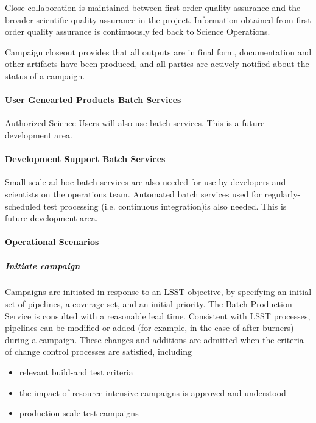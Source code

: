 Close collaboration is maintained between first order quality assurance and the
broader scientific quality assurance in the project. Information obtained from
first order quality assurance is continuously fed back to Science Operations.

Campaign closeout provides that all outputs are in final form, documentation and
other artifacts have been produced, and all parties are actively notified about
the status of a campaign.

\paragraph{User Genearted Products Batch Services}
Authorized Science Users will also use batch services.   This is a future development area.
\paragraph{Development Support Batch Services}
Small-scale ad-hoc batch services are also needed for use by developers and scientists on the operations team.
Automated batch services used for regularly-scheduled test processing (i.e. continuous integration)is also needed.
This is future development area.



\paragraph{Operational Scenarios}

\subparagraph{Initiate campaign}

Campaigns are initiated in response to an LSST objective, by specifying an
initial set of pipelines, a coverage set, and an initial priority. The Batch
Production Service is consulted with a reasonable lead time. Consistent with
LSST processes, pipelines can be modified or added (for example, in the case of
after-burners) during a campaign. These changes and additions are admitted when
the criteria of change control processes are satisfied, including

\begin{itemize}

\item relevant build-and test criteria

\item the impact of resource-intensive campaigns is approved and understood

\item production-scale test campaigns

\end{itemize}

